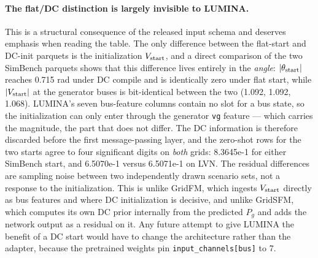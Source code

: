 \documentclass[10pt]{article}
\begin{document}
\paragraph{The flat/DC distinction is largely invisible to LUMINA.} This is a structural consequence of the released input schema and deserves emphasis when reading the table. The only difference between the flat-start and DC-init parquets is the initialization $V_{\rm start}$, and a direct comparison of the two SimBench parquets shows that this difference lives entirely in the \emph{angle}: $|\theta_{\rm start}|$ reaches 0.715 rad under DC compile and is identically zero under flat start, while $|V_{\rm start}|$ at the generator buses is bit-identical between the two (1.092, 1.092, 1.068). LUMINA's seven bus-feature columns contain no slot for a bus state, so the initialization can only enter through the generator \texttt{vg} feature --- which carries the magnitude, the part that does not differ. The DC information is therefore discarded before the first message-passing layer, and the zero-shot rows for the two starts agree to four significant digits on \emph{both} grids: 8.3645e-1 for either SimBench start, and 6.5070e-1 versus 6.5071e-1 on LVN. The residual differences are sampling noise between two independently drawn scenario sets, not a response to the initialization. This is unlike GridFM, which ingests $V_{\rm start}$ directly as bus features and where DC initialization is decisive, and unlike GridSFM, which computes its own DC prior internally from the predicted $P_g$ and adds the network output as a residual on it. Any future attempt to give LUMINA the benefit of a DC start would have to change the architecture rather than the adapter, because the pretrained weights pin \texttt{input\_channels[bus]} to 7.
\end{document}
